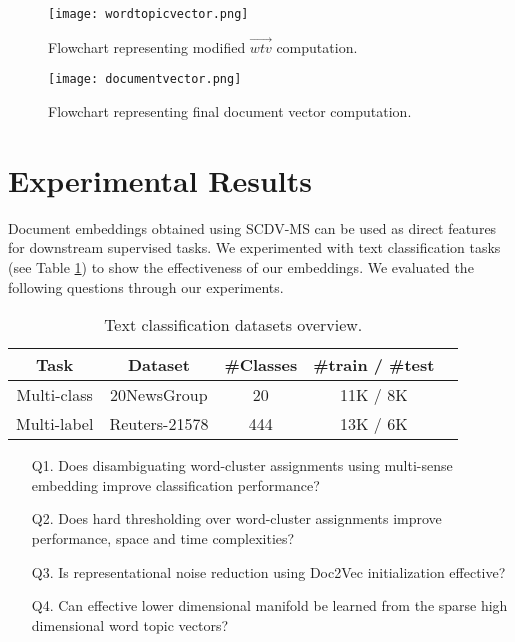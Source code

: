 \documentclass{ecai}
\newcommand{\method}{SCDV-MS}
\begin{document}
\begin{figure*}[!htb]
\captionsetup{font=small, skip=0.0pt}
  \texttt{[image: wordtopicvector.png]}
  \vspace{0.5 em}
  \caption{Flowchart representing modified $\vec{wtv}$ computation.}\label{figure:pipeline1}
\endminipage
\hfill
{}\captionsetup{font=small, skip=0pt}
  \texttt{[image: documentvector.png]}
  \vspace{0.5 em}
  \caption{Flowchart representing final document vector computation.}\label{figure:pipeline2}
\endminipage
\end{figure*}

\section{Experimental Results}
\label{sec:experiments}

Document embeddings obtained using \method{} can be used as direct features for downstream supervised tasks. We experimented with text classification tasks (see Table \ref{table:expplan}) to show the effectiveness of our embeddings. We evaluated the following questions through our experiments.
\begin{table}
\captionsetup{font=small, skip=0pt}
\vspace{-1.0em}
\caption{Text classification datasets overview.}
\begin{center}
\vspace{-1.0em}
\begin{tabular}{ c c c c c}
\hline
Task & Dataset & \#Classes & \#train / \#test \\ 
\hline
Multi-class & 20NewsGroup & 20 & 11K / 8K\\  
Multi-label & Reuters-21578 & 444 & 13K / 6K \\
\hline
\end{tabular}
\end{center}
\label{table:expplan}
\vspace{-2.4em}
\end{table}

\begin{enumerate}
\item[Q1.] Does disambiguating word-cluster assignments using multi-sense embedding improve classification performance?
\vspace{0.1cm}
\item[Q2.] Does hard thresholding over word-cluster assignments improve performance, space and time complexities? 
\vspace{0.1cm}
\item[Q3.] Is representational noise reduction using Doc2Vec initialization effective? 
\vspace{0.1cm}
\item[Q4.] Can effective lower dimensional manifold be learned from the sparse high dimensional word topic vectors?
\end{enumerate}
\end{document}
